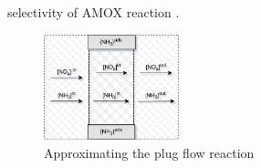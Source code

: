 selectivity of AMOX reaction \cite{jain2023diagnostics}.
\begin{figure}[ht]
    \centering
    \includegraphics[width=0.35\textwidth]{figs/2_mdl/plug_flow_discrete.png}
    \caption{Approximating the plug flow reaction}
    \label{fig:plug-flow}
\end{figure}




